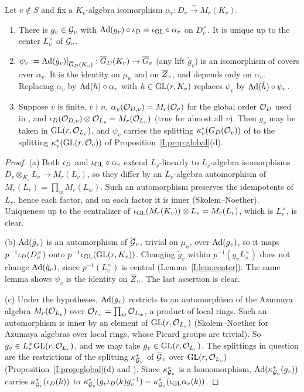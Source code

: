 \begin{proposition}\label{I:prop:outsideS}
Let $v\notin S$ and fix a $K_v$-algebra isomorphism $\alpha_v:D_v\xrightarrow{\sim}M_r(K_v)$.
\begin{enumerate}[label=(\alph*)]
\item There is $g_v\in\mathcal{G}_v$ with $\operatorname{Ad}(g_v)\circ\iota_D=\iota_{\mathrm{GL}}\circ\alpha_v$ on $D_v^\times$. It is unique up to the center $L_v^\times$ of $\mathcal{G}_v$.
\item $\psi_v:=\operatorname{Ad}(\tilde g_v)|_{\overline{G}_D(K_v)}:\overline{G}_D(K_v)\to\overline{G}_v$ (any lift $\tilde g_v$) is an isomorphism of covers over $\alpha_v$. It is the identity on $\mu_n$ and on $\overline{Z}_v$, and depends only on $\alpha_v$. Replacing $\alpha_v$ by $\operatorname{Ad}(h)\circ\alpha_v$ with $h\in\mathrm{GL}(r,K_v)$ replaces $\psi_v$ by $\operatorname{Ad}(\tilde h)\circ\psi_v$.
\item Suppose $v$ is finite, $v\nmid n$, $\alpha_v(\mathcal{O}_{D,v})=M_r(\mathcal{O}_v)$ for the global order $\mathcal{O}_D$ used in \cite[Lemma~6.1(d)]{JC26a}, and $\iota_D(\mathcal{O}_{D,v})\otimes\mathcal{O}_{L_v}=M_r(\mathcal{O}_{L_v})$ (true for almost all $v$). Then $g_v$ may be taken in $\mathrm{GL}(r,\mathcal{O}_{L_v})$, and $\psi_v$ carries the splitting $\kappa^{*}_v(G_D(\mathcal{O}_v))$ of \cite[Lemma~6.1(d)]{JC26a} to the splitting $\kappa^{*}_v(\mathrm{GL}(r,\mathcal{O}_v))$ of Proposition~\ref{I:prop:global}(d).
\end{enumerate}
\end{proposition}
\begin{proof}
(a) Both $\iota_D$ and $\iota_{\mathrm{GL}}\circ\alpha_v$ extend $L_v$-linearly to $L_v$-algebra isomorphisms $D_v\otimes_{K_v}L_v\to M_r(L_v)$, so they differ by an $L_v$-algebra automorphism of $M_r(L_v)=\prod_wM_r(L_w)$. Such an automorphism preserves the idempotents of $L_v$, hence each factor, and on each factor it is inner (Skolem--Noether). Uniqueness up to the centralizer of $\iota_{\mathrm{GL}}(M_r(K_v))\otimes L_v=M_r(L_v)$, which is $L_v^\times$, is clear.

(b) $\operatorname{Ad}(\tilde g_v)$ is an automorphism of $\overline{\mathcal{G}}_v$, trivial on $\mu_n$, over $\operatorname{Ad}(g_v)$, so it maps $p^{-1}\iota_D(D_v^\times)$ onto $p^{-1}\iota_{\mathrm{GL}}(\mathrm{GL}(r,K_v))$. Changing $\tilde g_v$ within $p^{-1}(g_vL_v^\times)$ does not change $\operatorname{Ad}(\tilde g_v)$, since $p^{-1}(L_v^\times)$ is central (Lemma~\ref{I:lem:center}). The same lemma shows $\psi_v$ is the identity on $\overline{Z}_v$. The last assertion is clear.

(c) Under the hypotheses, $\operatorname{Ad}(g_v)$ restricts to an automorphism of the Azumaya algebra $M_r(\mathcal{O}_{L_v})$ over $\mathcal{O}_{L_v}=\prod_w\mathcal{O}_{L_w}$, a product of local rings. Such an automorphism is inner by an element of $\mathrm{GL}(r,\mathcal{O}_{L_v})$ (Skolem--Noether for Azumaya algebras over local rings, whose Picard groups are trivial). So $g_v\in L_v^\times\mathrm{GL}(r,\mathcal{O}_{L_v})$, and we may take $g_v\in\mathrm{GL}(r,\mathcal{O}_{L_v})$. The splittings in question are the restrictions of the splitting $\kappa^{*}_{\mathcal{G}_v}$ of $\overline{\mathcal{G}}_v$ over $\mathrm{GL}(r,\mathcal{O}_{L_v})$ (Proposition~\ref{I:prop:global}(d) and \cite[Lemma~6.1(d)]{JC26a}). Since $\kappa^{*}_{\mathcal{G}_v}$ is a homomorphism, $\operatorname{Ad}(\kappa^{*}_{\mathcal{G}_v}(g_v))$ carries $\kappa^{*}_{\mathcal{G}_v}(\iota_D(k))$ to $\kappa^{*}_{\mathcal{G}_v}(g_v\iota_D(k)g_v^{-1})=\kappa^{*}_{\mathcal{G}_v}(\iota_{\mathrm{GL}}\alpha_v(k))$.
\end{proof}

